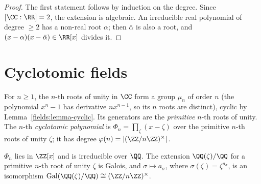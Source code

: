 \begin{proof}
The first statement follows by induction on the degree. Since $[\CC : \RR] = 2$, the
extension is algebraic. An irreducible real polynomial of degree $\geq 2$ has a non-real root
$\alpha$; then $\bar\alpha$ is also a root, and $(x - \alpha)(x - \bar\alpha) \in \RR[x]$ divides it.
\end{proof}

\section{Cyclotomic fields}\label{fields:section-cyclotomic}

\begin{definition}\label{fields:definition-roots-of-unity}
For $n \geq 1$, the $n$-th roots of unity in $\CC$ form a group $\mu_n$ of order $n$ (the polynomial
$x^n - 1$ has derivative $nx^{n-1}$, so its $n$ roots are distinct), cyclic by
Lemma~\ref{fields:lemma-cyclic}. Its generators are the \emph{primitive} $n$-th roots of unity.
The $n$-th \emph{cyclotomic polynomial} is $\Phi_n = \prod_{\zeta} (x - \zeta)$ over the primitive
$n$-th roots of unity $\zeta$; it has degree $\varphi(n) = |(\ZZ/n\ZZ)^\times|$.
\end{definition}

\begin{theorem}\label{fields:theorem-cyclotomic}
$\Phi_n$ lies in $\ZZ[x]$ and is irreducible over $\QQ$. The extension $\QQ(\zeta)/\QQ$ for a primitive
$n$-th root of unity $\zeta$ is Galois, and $\sigma \mapsto a_\sigma$, where $\sigma(\zeta) = \zeta^{a_\sigma}$, is an
isomorphism $\mathrm{Gal}(\QQ(\zeta)/\QQ) \cong (\ZZ/n\ZZ)^\times$.
\end{theorem}

